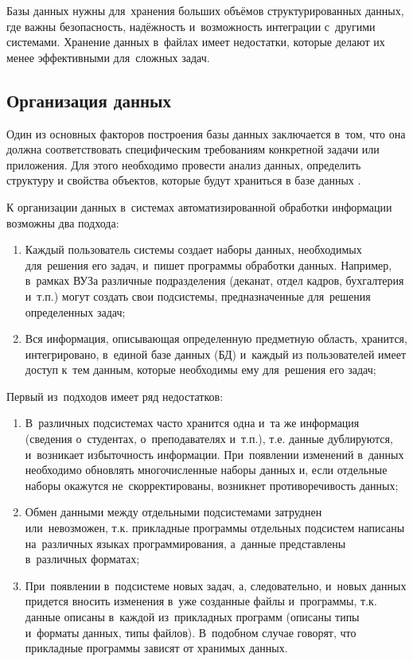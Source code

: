 \documentclass{ou}
\begin{document}
Базы данных нужны для~хранения больших объёмов структурированных данных, где важны безопасность, надёжность и~возможность интеграции с~другими системами. Хранение данных в~файлах имеет недостатки, которые делают их менее эффективными для~сложных задач.

\subsection{Организация данных}
Один из основных факторов построения базы данных заключается в~том, что она должна соответствовать специфическим требованиям конкретной задачи или приложения. Для этого необходимо провести анализ данных, определить структуру и свойства объектов, которые будут храниться в базе данных \cite{Senchenko2015}.

К организации данных в~системах автоматизированной обработки информации возможны два подхода: 
\begin{enumerate}[leftmargin=0em, itemindent=3.75em, nosep, label=\arabic*)]
\item Каждый пользователь системы создает наборы данных, необходимых для~решения его задач, и~пишет программы обработки данных. Например, в~рамках ВУЗа различные подразделения (деканат, отдел кадров, бухгалтерия и~т.п.) могут создать свои подсистемы, предназначенные для~решения определенных задач;
\item Вся информация, описывающая определенную предметную область, хранится, интегрировано, в~единой базе данных (БД) и~каждый из пользователей имеет доступ к~тем данным, которые необходимы ему для~решения его задач\cite{Karpova2013};
\end{enumerate}

Первый из~подходов имеет ряд недостатков:
\begin{enumerate}[leftmargin=0em, itemindent=3.75em, nosep, label=\arabic*)]
\item В~различных подсистемах часто хранится одна и~та же информация (сведения о~студентах, о~преподавателях и~т.п.), т.е. данные дублируются, и~возникает избыточность информации. При~появлении изменений в~данных необходимо обновлять многочисленные наборы данных и, если отдельные наборы окажутся не~скорректированы, возникнет противоречивость данных\cite{Sergeev2012};
\item Обмен данными между отдельными подсистемами затруднен или~невозможен, т.к. прикладные программы отдельных подсистем написаны на~различных языках программирования, а~данные представлены в~различных форматах;
\item При~появлении в~подсистеме новых задач, а, следовательно, и~новых данных придется вносить изменения в~уже созданные файлы и~программы, т.к. данные описаны в~каждой из~прикладных программ (описаны типы и~форматы данных, типы файлов). В~подобном случае говорят, что прикладные программы зависят от хранимых данных.
\end{enumerate}
\end{document}
